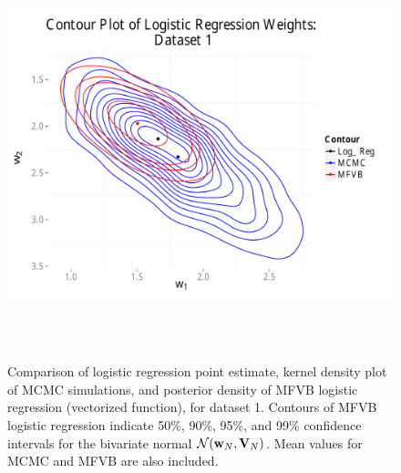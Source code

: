 \begin{figure}
\centering
	\includegraphics[height=120mm]{figures/mcmc_uniform_mfvb.pdf}
    \caption{Comparison of logistic regression point estimate, kernel density plot of MCMC simulations, and posterior density of
    MFVB logistic regression (vectorized function), for dataset 1.   Contours of MFVB logistic regression indicate
    50\%, 90\%, 95\%, and 99\% confidence intervals for the bivariate normal $\mathcal{N}(\boldsymbol{\mathbf{w}}_{N},\boldsymbol{\mathbf{V}}_N)$.
    Mean values for MCMC and MFVB are also included.}  \label{fig:mcmc_mfvb}  
\end{figure}